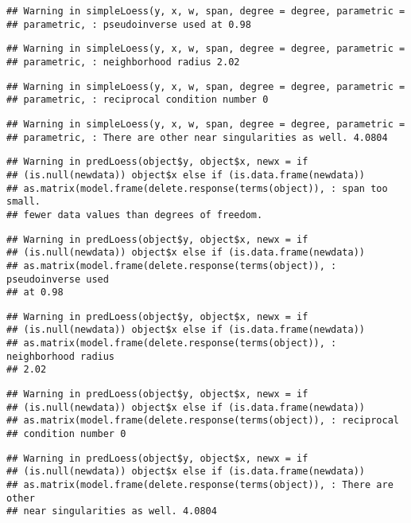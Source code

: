\documentclass[]{article}
\begin{document}
\begin{verbatim}
## Warning in simpleLoess(y, x, w, span, degree = degree, parametric =
## parametric, : pseudoinverse used at 0.98
\end{verbatim}

\begin{verbatim}
## Warning in simpleLoess(y, x, w, span, degree = degree, parametric =
## parametric, : neighborhood radius 2.02
\end{verbatim}

\begin{verbatim}
## Warning in simpleLoess(y, x, w, span, degree = degree, parametric =
## parametric, : reciprocal condition number 0
\end{verbatim}

\begin{verbatim}
## Warning in simpleLoess(y, x, w, span, degree = degree, parametric =
## parametric, : There are other near singularities as well. 4.0804
\end{verbatim}

\begin{verbatim}
## Warning in predLoess(object$y, object$x, newx = if
## (is.null(newdata)) object$x else if (is.data.frame(newdata))
## as.matrix(model.frame(delete.response(terms(object)), : span too small.
## fewer data values than degrees of freedom.
\end{verbatim}

\begin{verbatim}
## Warning in predLoess(object$y, object$x, newx = if
## (is.null(newdata)) object$x else if (is.data.frame(newdata))
## as.matrix(model.frame(delete.response(terms(object)), : pseudoinverse used
## at 0.98
\end{verbatim}

\begin{verbatim}
## Warning in predLoess(object$y, object$x, newx = if
## (is.null(newdata)) object$x else if (is.data.frame(newdata))
## as.matrix(model.frame(delete.response(terms(object)), : neighborhood radius
## 2.02
\end{verbatim}

\begin{verbatim}
## Warning in predLoess(object$y, object$x, newx = if
## (is.null(newdata)) object$x else if (is.data.frame(newdata))
## as.matrix(model.frame(delete.response(terms(object)), : reciprocal
## condition number 0
\end{verbatim}

\begin{verbatim}
## Warning in predLoess(object$y, object$x, newx = if
## (is.null(newdata)) object$x else if (is.data.frame(newdata))
## as.matrix(model.frame(delete.response(terms(object)), : There are other
## near singularities as well. 4.0804
\end{verbatim}
\end{document}
